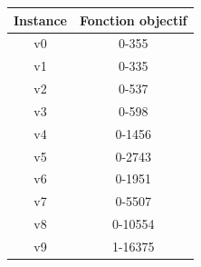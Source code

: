 \documentclass[a4paper, 11pt]{article} %
\begin{document}
\begin{center}
\begin{tabular}{|c|c|}
 \hline 
 Instance & Fonction objectif \\ \hline
 v0 &  0-355\\ \hline
 v1 &  0-335\\ \hline
 v2 &  0-537\\ \hline
 v3 &  0-598 \\ \hline
 v4 &  0-1456 \\ \hline
 v5 &  0-2743 \\ \hline
 v6 &  0-1951 \\ \hline
 v7 &  0-5507\\ \hline
 v8 &  0-10554\\ \hline
 v9 &  1-16375\\ \hline

\end{tabular}
\end{center}
\end{document}
